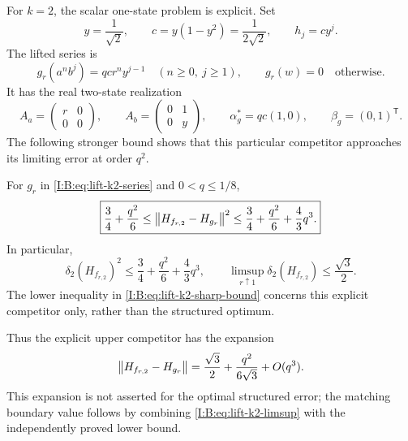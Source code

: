 For $k=2$, the scalar one-state problem is explicit. Set
\begin{equation}
 y=\frac1{\sqrt2},\qquad c=y(1-y^2)=\frac1{2\sqrt2},\qquad
 h_j=cy^j.
 \label{I:B:eq:lift-k2-parameters}
\end{equation}
The lifted series is
\begin{equation}
 g_r(a^n b^j)=q c r^n y^{j-1}
 \quad(n\ge0,\ j\ge1),\qquad g_r(w)=0\quad\text{otherwise}.
 \label{I:B:eq:lift-k2-series}
\end{equation}
It has the real two-state realization
\begin{equation}
 A_a=\begin{pmatrix}r&0\\0&0\end{pmatrix},\qquad
 A_b=\begin{pmatrix}0&1\\0&y\end{pmatrix},\qquad
 \alpha_g^*=qc(1,0),\qquad\beta_g=(0,1)^{\mathsf T}.
 \label{I:B:eq:lift-k2-realization}
\end{equation}
The following stronger bound shows that this particular competitor
approaches its limiting error at order $q^2$.

\begin{proposition}
\label{I:B:prop:lift-k2-sharp}
For $g_r$ in \eqref{I:B:eq:lift-k2-series} and $0<q\le1/8$,
\begin{equation}
 \boxed{\displaystyle
 \frac34+\frac{q^2}{6}
 \le\left\lVert H_{f_{r,2}}-H_{g_r}\right\rVert^2
 \le\frac34+\frac{q^2}{6}+\frac43q^3.}
 \label{I:B:eq:lift-k2-sharp-bound}
\end{equation}
In particular,
\begin{equation}
 \delta_2(H_{f_{r,2}})^2
 \le\frac34+\frac{q^2}{6}+\frac43q^3,
 \qquad
 \limsup_{r\uparrow1}\delta_2(H_{f_{r,2}})\le\frac{\sqrt3}{2}.
 \label{I:B:eq:lift-k2-limsup}
\end{equation}
The lower inequality in \eqref{I:B:eq:lift-k2-sharp-bound} concerns this
explicit competitor only, rather than the structured optimum.
\end{proposition}



Thus the explicit upper competitor has the expansion
\[
 \left\lVert H_{f_{r,2}}-H_{g_r}\right\rVert
 =\frac{\sqrt3}{2}+\frac{q^2}{6\sqrt3}+O(q^3).
\]
This expansion is not asserted for the optimal structured error; the
matching boundary value follows by combining
\eqref{I:B:eq:lift-k2-limsup} with the independently proved lower bound.

